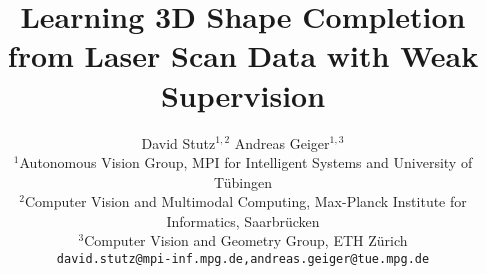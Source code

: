 \documentclass[10pt,twocolumn,letterpaper]{article}
\begin{document}
\title{Learning 3D Shape Completion from Laser Scan Data with Weak Supervision}
\author{David Stutz$^{1,2}$ \qquad Andreas Geiger$^{1,3}$\\
$^1$Autonomous Vision Group, MPI for Intelligent Systems and University of Tübingen\\
$^2$Computer Vision and Multimodal Computing, Max-Planck Institute for Informatics, Saarbr\"{u}cken\\
$^3$Computer Vision and Geometry Group, ETH Z\"{u}rich\\
{\tt\small david.stutz@mpi-inf.mpg.de,andreas.geiger@tue.mpg.de}	
}

\clearpage\maketitle








{\small
	
	
}
\end{document}
